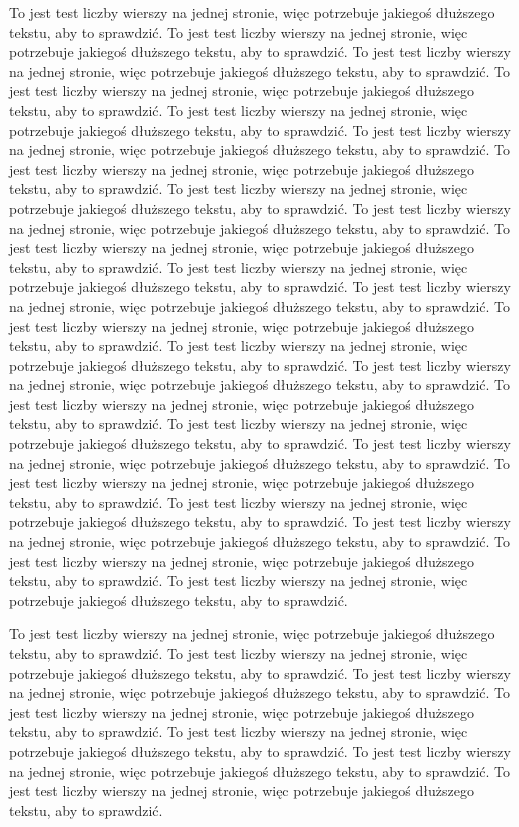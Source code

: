 To jest test liczby wierszy na jednej stronie, więc potrzebuje jakiegoś dłuższego tekstu, aby to sprawdzić.
To jest test liczby wierszy na jednej stronie, więc potrzebuje jakiegoś dłuższego tekstu, aby to sprawdzić.
To jest test liczby wierszy na jednej stronie, więc potrzebuje jakiegoś dłuższego tekstu, aby to sprawdzić.
To jest test liczby wierszy na jednej stronie, więc potrzebuje jakiegoś dłuższego tekstu, aby to sprawdzić.
To jest test liczby wierszy na jednej stronie, więc potrzebuje jakiegoś dłuższego tekstu, aby to sprawdzić.
To jest test liczby wierszy na jednej stronie, więc potrzebuje jakiegoś dłuższego tekstu, aby to sprawdzić.
To jest test liczby wierszy na jednej stronie, więc potrzebuje jakiegoś dłuższego tekstu, aby to sprawdzić.
To jest test liczby wierszy na jednej stronie, więc potrzebuje jakiegoś dłuższego tekstu, aby to sprawdzić.
To jest test liczby wierszy na jednej stronie, więc potrzebuje jakiegoś dłuższego tekstu, aby to sprawdzić.
To jest test liczby wierszy na jednej stronie, więc potrzebuje jakiegoś dłuższego tekstu, aby to sprawdzić.
To jest test liczby wierszy na jednej stronie, więc potrzebuje jakiegoś dłuższego tekstu, aby to sprawdzić.
To jest test liczby wierszy na jednej stronie, więc potrzebuje jakiegoś dłuższego tekstu, aby to sprawdzić.
To jest test liczby wierszy na jednej stronie, więc potrzebuje jakiegoś dłuższego tekstu, aby to sprawdzić.
To jest test liczby wierszy na jednej stronie, więc potrzebuje jakiegoś dłuższego tekstu, aby to sprawdzić.
To jest test liczby wierszy na jednej stronie, więc potrzebuje jakiegoś dłuższego tekstu, aby to sprawdzić.
To jest test liczby wierszy na jednej stronie, więc potrzebuje jakiegoś dłuższego tekstu, aby to sprawdzić.
To jest test liczby wierszy na jednej stronie, więc potrzebuje jakiegoś dłuższego tekstu, aby to sprawdzić.
To jest test liczby wierszy na jednej stronie, więc potrzebuje jakiegoś dłuższego tekstu, aby to sprawdzić.
To jest test liczby wierszy na jednej stronie, więc potrzebuje jakiegoś dłuższego tekstu, aby to sprawdzić.
To jest test liczby wierszy na jednej stronie, więc potrzebuje jakiegoś dłuższego tekstu, aby to sprawdzić.
To jest test liczby wierszy na jednej stronie, więc potrzebuje jakiegoś dłuższego tekstu, aby to sprawdzić.
To jest test liczby wierszy na jednej stronie, więc potrzebuje jakiegoś dłuższego tekstu, aby to sprawdzić.
To jest test liczby wierszy na jednej stronie, więc potrzebuje jakiegoś dłuższego tekstu, aby to sprawdzić.

To jest test liczby wierszy na jednej stronie, więc potrzebuje jakiegoś dłuższego tekstu, aby to sprawdzić.
To jest test liczby wierszy na jednej stronie, więc potrzebuje jakiegoś dłuższego tekstu, aby to sprawdzić.
To jest test liczby wierszy na jednej stronie, więc potrzebuje jakiegoś dłuższego tekstu, aby to sprawdzić.
To jest test liczby wierszy na jednej stronie, więc potrzebuje jakiegoś dłuższego tekstu, aby to sprawdzić.
To jest test liczby wierszy na jednej stronie, więc potrzebuje jakiegoś dłuższego tekstu, aby to sprawdzić.
To jest test liczby wierszy na jednej stronie, więc potrzebuje jakiegoś dłuższego tekstu, aby to sprawdzić.
To jest test liczby wierszy na jednej stronie, więc potrzebuje jakiegoś dłuższego tekstu, aby to sprawdzić.

\listoffigures



